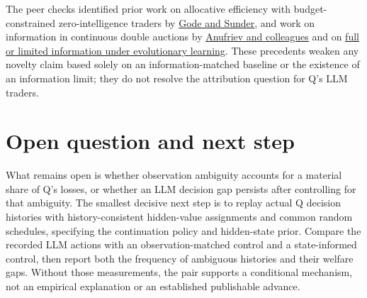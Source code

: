 \documentclass{article}
\begin{document}
The peer checks identified prior work on allocative efficiency with budget-constrained zero-intelligence traders by \href{https://www.journals.uchicago.edu/doi/pdf/10.1086/261868}{Gode and Sunder}, and work on information in continuous double auctions by \href{https://authors.library.caltech.edu/records/2xr9q-wnz20}{Anufriev and colleagues} and on \href{https://link.springer.com/article/10.1007/s00191-011-0230-8}{full or limited information under evolutionary learning}. These precedents weaken any novelty claim based solely on an information-matched baseline or the existence of an information limit; they do not resolve the attribution question for Q's LLM traders.

\section{Open question and next step}

What remains open is whether observation ambiguity accounts for a material share of Q's losses, or whether an LLM decision gap persists after controlling for that ambiguity. The smallest decisive next step is to replay actual Q decision histories with history-consistent hidden-value assignments and common random schedules, specifying the continuation policy and hidden-state prior. Compare the recorded LLM actions with an observation-matched control and a state-informed control, then report both the frequency of ambiguous histories and their welfare gaps. Without those measurements, the pair supports a conditional mechanism, not an empirical explanation or an established publishable advance.
\end{document}
